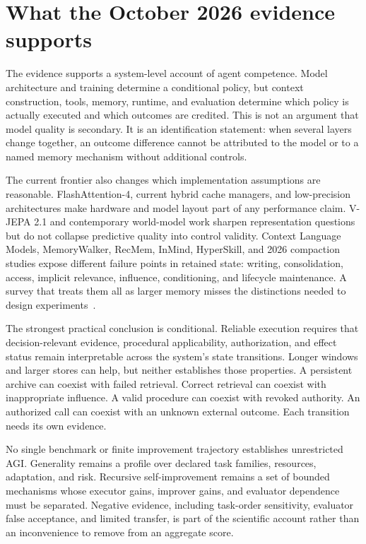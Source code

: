 \section{What the October 2026 evidence supports}\label{sec:C34:01}
The evidence supports a system-level account of agent competence. Model architecture and training determine a conditional policy, but context construction, tools, memory, runtime, and evaluation determine which policy is actually executed and which outcomes are credited. This is not an argument that model quality is secondary. It is an identification statement: when several layers change together, an outcome difference cannot be attributed to the model or to a named memory mechanism without additional controls.

The current frontier also changes which implementation assumptions are reasonable. FlashAttention-4, current hybrid cache managers, and low-precision architectures make hardware and model layout part of any performance claim. V-JEPA 2.1 and contemporary world-model work sharpen representation questions but do not collapse predictive quality into control validity. Context Language Models, MemoryWalker, RecMem, InMind, HyperSkill, and 2026 compaction studies expose different failure points in retained state: writing, consolidation, access, implicit relevance, influence, conditioning, and lifecycle maintenance. A survey that treats them all as larger memory misses the distinctions needed to design experiments~\cite{rewrite_fa4,rewrite_vjepa21,shao2026context,j2026memorywalker,dai2026recmem,inmind2026,xu2026hyperskill}.

The strongest practical conclusion is conditional. Reliable execution requires that decision-relevant evidence, procedural applicability, authorization, and effect status remain interpretable across the system's state transitions. Longer windows and larger stores can help, but neither establishes those properties. A persistent archive can coexist with failed retrieval. Correct retrieval can coexist with inappropriate influence. A valid procedure can coexist with revoked authority. An authorized call can coexist with an unknown external outcome. Each transition needs its own evidence.

No single benchmark or finite improvement trajectory establishes unrestricted AGI. Generality remains a profile over declared task families, resources, adaptation, and risk. Recursive self-improvement remains a set of bounded mechanisms whose executor gains, improver gains, and evaluator dependence must be separated. Negative evidence, including task-order sensitivity, evaluator false acceptance, and limited transfer, is part of the scientific account rather than an inconvenience to remove from an aggregate score.

